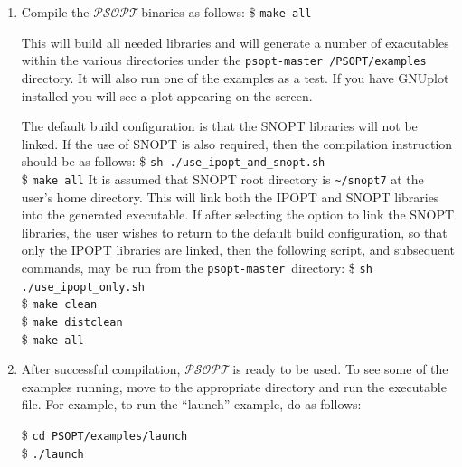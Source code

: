 \documentclass[a4paper,11pt]{report}    %
\newcommand{\psopt}{$\mathcal{PSOPT}$\,}  %
\newcommand{\basedir}{\texttt{psopt-master\,}}
\newcommand{\shell}[1]{\$ \texttt{#1}\\}
\newcommand{\shellcont}[1]{\texttt{#1}\\}
\newenvironment{shadedframe}{%
  \def\FrameCommand{\fcolorbox{black}{shadecolor}}%
  \MakeFramed {\FrameRestore}}
{\endMakeFramed}
\begin{document}
\begin{enumerate}
 \href{http://www.stanford.edu/group/SOL/software/lusol/lusol.zip}{http://www.stanford.edu/group/SOL/software/lusol/lusol.zip}

and copy and extract the archive into the \basedir directory created in the previous step.

\begin{shadedframe}
\shell{wget --continue http://www.stanford.edu/group/SOL/}
\shellcont{software/lusol/lusol.zip}
\shell{unzip lusol.zip}
\end{shadedframe}

\item Compile the \psopt binaries as follows:
\begin{shadedframe}
   \$ \verb|make all|
\end{shadedframe}

This will build all needed libraries and will generate a number of exacutables within the various
directories under the \texttt{\basedir/PSOPT/examples} directory. It will also run one of the examples as a test. If you have GNUplot installed
you will see a plot appearing on the screen.

The default build configuration is that the SNOPT libraries will not be linked. 
If the use of SNOPT is also required, then the compilation instruction should be
as follows:
\begin{shadedframe}
   \$ \verb|sh ./use_ipopt_and_snopt.sh| \\
   \$ \verb|make all|
\end{shadedframe}
It is assumed that SNOPT root directory is \verb|~/snopt7| at the user's
home directory. This will link both the IPOPT and SNOPT libraries into the generated
executable. If after selecting the option to link the SNOPT libraries, the user wishes to return to the default build configuration,
so that only the IPOPT libraries are linked, then the following script, and subsequent commands, may be run from the \basedir directory:
\begin{shadedframe}
   \$ \verb|sh ./use_ipopt_only.sh| \\
   \$ \verb|make clean| \\
   \$ \verb|make distclean| \\
   \$ \verb|make all|
\end{shadedframe}


\item  After successful compilation, \psopt is ready to be used. To see some of the examples running, move to
the appropriate directory and run the executable file. For example, to
run the ``launch'' example, do as follows:

\begin{shadedframe}
   \$ \verb|cd PSOPT/examples/launch|    \\
   \$ \verb|./launch|
\end{shadedframe}



\end{enumerate}
\end{document}
